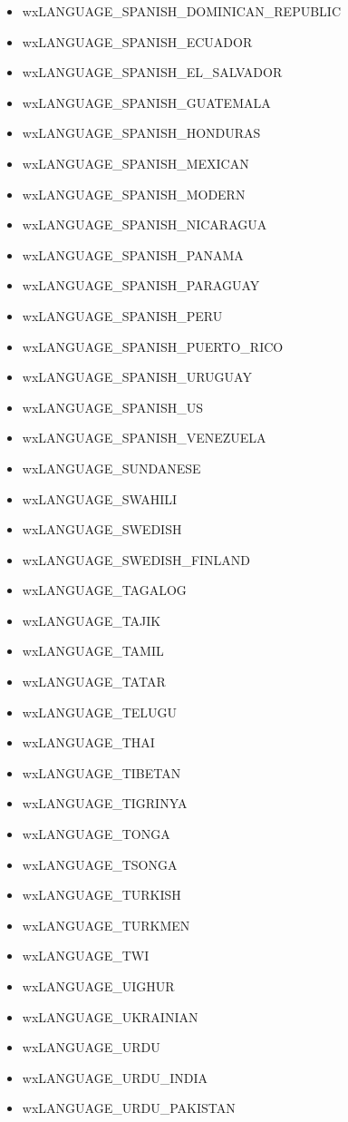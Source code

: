 \begin{itemize}
\item wxLANGUAGE\_SPANISH\_DOMINICAN\_REPUBLIC
\item wxLANGUAGE\_SPANISH\_ECUADOR
\item wxLANGUAGE\_SPANISH\_EL\_SALVADOR
\item wxLANGUAGE\_SPANISH\_GUATEMALA
\item wxLANGUAGE\_SPANISH\_HONDURAS
\item wxLANGUAGE\_SPANISH\_MEXICAN
\item wxLANGUAGE\_SPANISH\_MODERN
\item wxLANGUAGE\_SPANISH\_NICARAGUA
\item wxLANGUAGE\_SPANISH\_PANAMA
\item wxLANGUAGE\_SPANISH\_PARAGUAY
\item wxLANGUAGE\_SPANISH\_PERU
\item wxLANGUAGE\_SPANISH\_PUERTO\_RICO
\item wxLANGUAGE\_SPANISH\_URUGUAY
\item wxLANGUAGE\_SPANISH\_US
\item wxLANGUAGE\_SPANISH\_VENEZUELA
\item wxLANGUAGE\_SUNDANESE
\item wxLANGUAGE\_SWAHILI
\item wxLANGUAGE\_SWEDISH
\item wxLANGUAGE\_SWEDISH\_FINLAND
\item wxLANGUAGE\_TAGALOG
\item wxLANGUAGE\_TAJIK
\item wxLANGUAGE\_TAMIL
\item wxLANGUAGE\_TATAR
\item wxLANGUAGE\_TELUGU
\item wxLANGUAGE\_THAI
\item wxLANGUAGE\_TIBETAN
\item wxLANGUAGE\_TIGRINYA
\item wxLANGUAGE\_TONGA
\item wxLANGUAGE\_TSONGA
\item wxLANGUAGE\_TURKISH
\item wxLANGUAGE\_TURKMEN
\item wxLANGUAGE\_TWI
\item wxLANGUAGE\_UIGHUR
\item wxLANGUAGE\_UKRAINIAN
\item wxLANGUAGE\_URDU
\item wxLANGUAGE\_URDU\_INDIA
\item wxLANGUAGE\_URDU\_PAKISTAN

\end{itemize}
